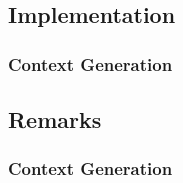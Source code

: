 \documentclass[11pt]{beamer}
\begin{document}

\subsection{Implementation}


\begin{frame}

\frametitle{Context Generation}
\framesubtitle{}

\end{frame}


\subsection{Remarks}


\begin{frame}

\frametitle{Context Generation}
\framesubtitle{}

\end{frame}

\end{document}
